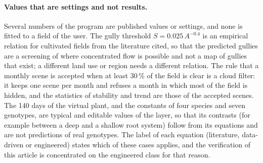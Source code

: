 \paragraph{Values that are settings and not results.} Several numbers of the program are published values or settings, and none is fitted to a field of the user. The gully threshold $S=0.025\,A^{-0.4}$ is an empirical relation for cultivated fields from the literature cited, so that the predicted gullies are a screening of where concentrated flow is possible and not a map of gullies that exist; a different land use or region needs a different relation. The rule that a monthly scene is accepted when at least 30\,\% of the field is clear is a cloud filter: it keeps one scene per month and refuses a month in which most of the field is hidden, and the statistics of stability and trend are those of the accepted scenes. The 140 days of the virtual plant, and the constants of four species and seven genotypes, are typical and editable values of the layer, so that its contrasts (for example between a deep and a shallow root system) follow from its equations and are not predictions of real genotypes. The label of each equation (literature, data-driven or engineered) states which of these cases applies, and the verification of this article is concentrated on the engineered class for that reason.

